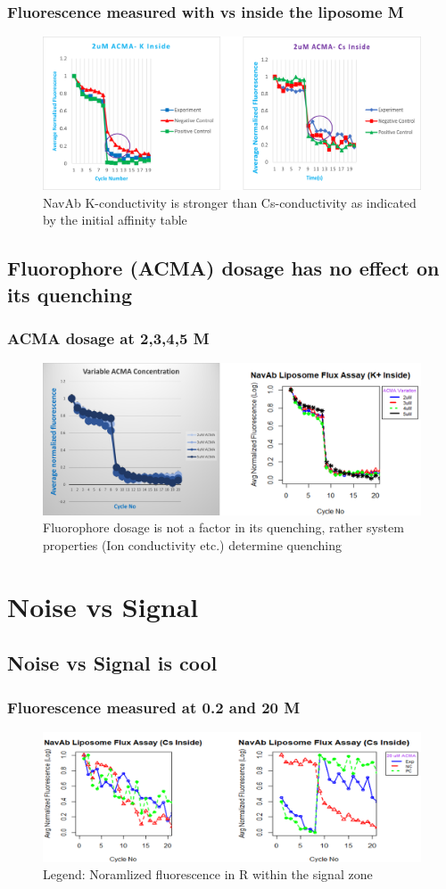 \documentclass[10pt]{beamer}
\begin{document}
\begin{frame}
\label{Comparative NavAb conductivity using Cs and K}
\frametitle{Fluorescence measured with  vs  inside the liposome \mu M}
\begin{figure}
\includegraphics[width=.70\textwidth, valign=t]{images/p8.png}
\caption{NavAb K-conductivity is stronger than Cs-conductivity as indicated by the initial affinity table}
\end{figure}
\end{frame}


\subsection{Fluorophore (ACMA) dosage has no effect on its quenching}
\begin{frame}
\label{ACMA dosage is not important}
\frametitle{ACMA dosage at 2,3,4,5 \mu M}
\begin{figure}
\includegraphics[width=.70\textwidth, valign=t]{images/p9.png}
\caption{Fluorophore dosage is not a factor in its quenching, rather system properties (Ion conductivity etc.) determine quenching}
\end{figure}
\end{frame}

\section{Noise vs Signal}

\subsection{Noise vs Signal is cool}
\begin{frame}
\label{Fluorescence measured in the noise zone}
\frametitle{Fluorescence measured at 0.2 and 20 \mu M}
\begin{figure}
\includegraphics[width=.70\textwidth, valign=t]{images/p10.png}
\caption{Legend: Noramlized fluorescence in R within the signal zone}
\end{figure}
\end{frame}
\end{document}
